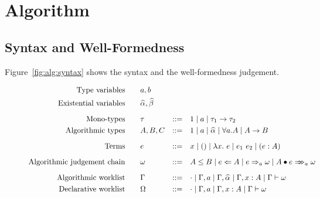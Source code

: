\section{Algorithm}

\subsection{Syntax and Well-Formedness}

Figure~\ref{fig:alg:syntax} shows the
syntax and the well-formedness judgement.

\begin{figure}
\begin{gather*}
\begin{aligned}
\text{Type variables}\qquad&a, b\\
\text{Existential variables}\qquad&\al, \bt
\\[2mm]
\text{Mono-types}\qquad&\tau &::=&\quad 1 \mid a \mid \tau_1\to \tau_2\\
\text{Algorithmic types}\qquad&A, B, C &::=&\quad 1 \mid a \mid \al \mid \forall a. A \mid A\to B
\\[2mm]
\text{Terms}\qquad&e&::=&\quad x \mid () \mid \lam{e} \mid e_1~e_2 \mid (e:A)
\\[2mm]
\text{Algorithmic judgement chain}\qquad&\jg &::=&\quad A \le B \mid e\Lto A \mid e\To_{a} \jg \mid \appInfAlg{A}{e}
\\[2mm]
\text{Algorithmic worklist}\qquad&\Gm &::=&\quad \cdot \mid \Gm, a \mid \Gm, \al \mid \Gm, x: A \mid \Gm \vdash \jg\\
\text{Declarative worklist}\qquad&\Om &::=&\quad \cdot \mid \Gm, a \mid \Gm, x: A \mid \Gm \vdash \jg
\end{aligned}
\end{gather*}


\end{figure}
